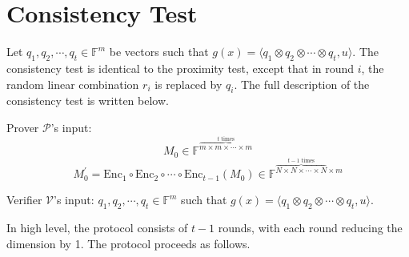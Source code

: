 \section{Consistency Test}

Let $q_1, q_2, \cdots, q_t \in \mathbb{F}^{m}$ be vectors such that $g(x) =\langle q_1 \otimes q_2 \otimes \cdots \otimes q_t, u \rangle $. The consistency test is identical to the proximity test, except that in round $i$, the random linear combination $r_i$ is replaced by $q_i$. The full description of the consistency test is written below.

Prover $\mathcal{P}$'s input: 
$$
    M_0 \in \mathbb{F}^{\overbrace{m \times m \times \cdots \times m}^{t \text{ times}}}
$$
$$
    M_0^{\prime} = \text{Enc}_1 \circ \text{Enc}_2 \circ \cdots \circ \text{Enc}_{t-1}(M_0) \in \mathbb{F}^{\overbrace{N \times N \times \cdots \times N}^{t-1 \text{ times}} \times m}
$$

Verifier $\mathcal{V}$'s input: $q_1, q_2, \cdots, q_t \in \mathbb{F}^{m}$ such that $g(x) =\langle q_1 \otimes q_2 \otimes \cdots \otimes q_t, u \rangle$.

In high level, the protocol consists of $t-1$ rounds, with each round reducing the dimension by 1. The protocol proceeds as follows. 

